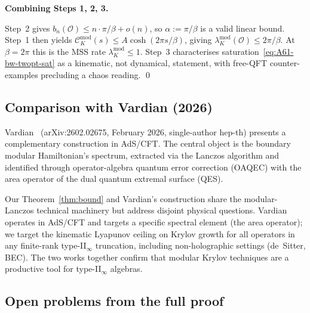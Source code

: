 \documentclass[12pt,a4paper]{article}
\begin{document}
\medskip

\noindent\textbf{Combining Steps 1, 2, 3.}

Step~2 gives $b_n(\mathcal{O}) \le n\cdot\pi/\beta + o(n)$, so
$\alpha := \pi/\beta$ is a valid linear bound. Step~1 then yields
$\mathcal{C}_K^{\mathrm{mod}}(s) \le A\cosh(2\pi s/\beta)$, giving
$\lambda_K^{\mathrm{mod}}(\mathcal{O}) \le 2\pi/\beta$.
At $\beta = 2\pi$ this is the MSS rate $\lambda_K^{\mathrm{mod}} \le 1$.
Step~3 characterises saturation~\eqref{eq:A61-bw-twopt-sat} as a
kinematic, not dynamical, statement, with free-QFT counter-examples
precluding a chaos reading. \qed

\subsection{Comparison with Vardian (2026)}
\label{ssec:A61-vardian}

Vardian~\cite{Vardian2026} (arXiv:2602.02675, February 2026,
single-author hep-th) presents a complementary construction in AdS/CFT.
The central object is the boundary modular Hamiltonian's spectrum,
extracted via the Lanczos algorithm and identified through
operator-algebra quantum error correction (OAQEC) with the area
operator of the dual quantum extremal surface (QES).

Our Theorem~\ref{thm:bound} and Vardian's construction share the
modular-Lanczos technical machinery but address disjoint physical
questions. Vardian operates in AdS/CFT and targets a specific spectral
element (the area operator); we target the kinematic Lyapunov ceiling on
Krylov growth for all operators in any finite-rank type-II$_\infty$
truncation, including non-holographic settings (de~Sitter, BEC).
The two works together confirm that modular Krylov techniques are a
productive tool for type-II$_\infty$ algebras.

\subsection{Open problems from the full proof}
\label{ssec:A61-open}
\end{document}
